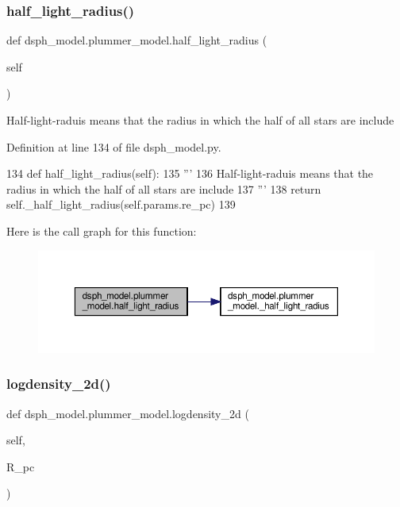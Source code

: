 \subsubsection{\texorpdfstring{half\+\_\+light\+\_\+radius()}{half\_light\_radius()}}
{\footnotesize\ttfamily def dsph\+\_\+model.\+plummer\+\_\+model.\+half\+\_\+light\+\_\+radius (\begin{DoxyParamCaption}\item[{}]{self }\end{DoxyParamCaption})}

\begin{DoxyVerb}Half-light-raduis means that the radius in which the half of all stars are include
\end{DoxyVerb}
 

Definition at line 134 of file dsph\+\_\+model.\+py.


\begin{DoxyCode}
134     \textcolor{keyword}{def }half\_light\_radius(self):
135         \textcolor{stringliteral}{'''}
136 \textcolor{stringliteral}{        Half-light-raduis means that the radius in which the half of all stars are include}
137 \textcolor{stringliteral}{        '''}
138         \textcolor{keywordflow}{return} self.\_half\_light\_radius(self.params.re\_pc)
139 
\end{DoxyCode}
Here is the call graph for this function\+:\nopagebreak
\begin{figure}[H]
\begin{center}
\leavevmode
\includegraphics[width=350pt]{d4/d46/classdsph__model_1_1plummer__model_a17a85f2954201bcef154bbc65c7794fc_cgraph}
\end{center}
\end{figure}
\mbox{\label{classdsph__model_1_1plummer__model_a5e62170fd4065bdc0bab2b032c8c9fa6}} 
\subsubsection{\texorpdfstring{logdensity\+\_\+2d()}{logdensity\_2d()}}
{\footnotesize\ttfamily def dsph\+\_\+model.\+plummer\+\_\+model.\+logdensity\+\_\+2d (\begin{DoxyParamCaption}\item[{}]{self,  }\item[{}]{R\+\_\+pc }\end{DoxyParamCaption})}



